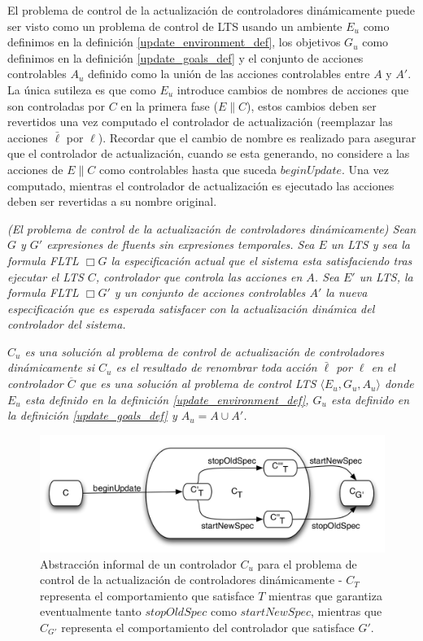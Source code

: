 El problema de control de la actualización de controladores dinámicamente puede ser visto como un problema de control de
LTS usando un ambiente $E_u$ como definimos en la definición \ref{update_environment_def}, los objetivos $G_u$ como
definimos en la definición \ref{update_goals_def} y el conjunto de acciones controlables $A_u$ definido como la unión de las
acciones controlables entre $A$ y $A'$. La única sutileza es que como $E_u$ introduce cambios de nombres de acciones que
son controladas por $C$ en la primera fase ($E\|C$), estos cambios deben ser revertidos una vez computado el controlador
de actualización (reemplazar las acciones $\bar{\ell}$ por $\ell$). Recordar que el cambio de nombre es realizado para
asegurar que el controlador de actualización, cuando se esta generando, no considere a las acciones de $E\|C$ como
controlables hasta que suceda $beginUpdate$. Una vez computado, mientras el controlador de actualización es ejecutado
las acciones deben ser revertidas a su nombre original.

\begin{nahaDef}
\emph{(El problema de control de la actualización de controladores dinámicamente) Sean $G$ y $G'$ expresiones de fluents
sin expresiones temporales. Sea $E$ un LTS y sea la formula FLTL $\Box G$ la especificación actual que el sistema esta
satisfaciendo tras ejecutar el LTS $C$, controlador que controla las acciones en $A$. Sea $E'$ un LTS, la formula FLTL
$\Box G'$ y un conjunto de acciones controlables $A'$ la nueva especificación que es esperada satisfacer con la
actualización dinámica del controlador del sistema.}

\emph{$C_u$ es una solución al problema de control de actualización de controladores dinámicamente si $C_u$ es el resultado de
renombrar toda acción $\bar{\ell}$ por $\ell$ en el controlador $\overline{C}$ que es una solución al problema de
control LTS $\langle E_u, G_u, A_u \rangle$ donde $E_u$ esta definido en la definición \ref{update_environment_def},
$G_u$ esta definido en la definición \ref{update_goals_def} y $A_u = A \cup A'$.}
\label{updating_controller_problem}
\end{nahaDef}

\begin{figure}
\centering
\includegraphics[scale=0.35]{img/C_u.png}
\caption{Abstracción informal de un controlador $C_u$ para el problema de control de la actualización de controladores
dinámicamente - $C_T$ representa el comportamiento que satisface $T$ mientras que garantiza eventualmente tanto
$stopOldSpec$ como $startNewSpec$, mientras que $C_{G'}$ representa el comportamiento del controlador que satisface
$G'$.}
\label{update_controller}
\end{figure}


